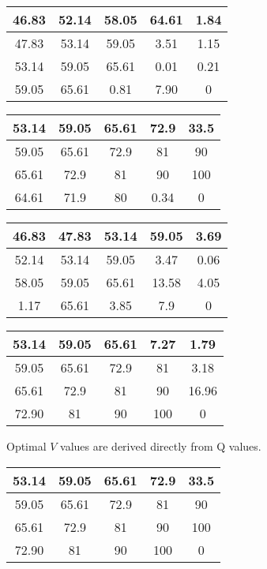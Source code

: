 \documentclass{article}
\begin{document}
\begin{table*}[h!]
\centering
\begin{tabular}{|c|c|c|c|c|}
\hline
46.83	&52.14	&58.05	&64.61	&1.84 \\
\hline
47.83	&53.14	&59.05	&3.51	&1.15\\
\hline
53.14	&59.05	&65.61	&0.01	&0.21\\
\hline
59.05	&65.61	&0.81	&7.90	&0\\
\hline
\end{tabular}
\caption{Optimal Q values for action "up", Q-learning}	
\quad
\begin{tabular}{|c|c|c|c|c|}
\hline
53.14	& 59.05 & 	65.61 &	72.9	& 33.5 \\
\hline
59.05	& 65.61 & 72.9	& 81& 90 \\
\hline
65.61	&72.9	&81	&90	&100\\
\hline
64.61	&71.9	&80	&0.34	&0\\
\hline
\end{tabular}
\caption{Optimal Q values for action "down", Q-learning}	
\begin{tabular}{|c|c|c|c|c|}
\hline
46.83	&47.83	&53.14	&59.05	&3.69\\
\hline
52.14	&53.14	&59.05	&3.47	&0.06\\
\hline
58.05	&59.05	&65.61	&13.58	&4.05\\
\hline
1.17	&65.61	&3.85	&7.9 	&0\\
\hline
\end{tabular}
\caption{Optimal Q values for action "left", Q-learning}	
\begin{tabular}{|c|c|c|c|c|}
\hline
53.14	&59.05	&65.61	&7.27&	1.79\\
\hline
59.05	&65.61	&72.9	&81	&3.18\\
\hline
65.61	&72.9	&81	&90	&16.96\\
\hline
72.90&	81&	90&	100	&0\\
\hline
\end{tabular}
\caption{Optimal Q values for action "right", Q-learning}	
\end{table*}

Optimal $V$ values are derived directly from Q values.
\begin{table*}[h!]
\centering
\begin{tabular}{|c|c|c|c|c|}
\hline
53.14&	59.05	&65.61	&72.9	&33.5\\
\hline
59.05	&65.61&	72.9&	81&	90\\
\hline
65.61	&72.9	&81	&90	&100\\
\hline
72.90	&81&	90	&100	&0\\
\hline
\end{tabular}
\caption{Optimal V values, Q-learning}	
\end{table*}
\end{document}
